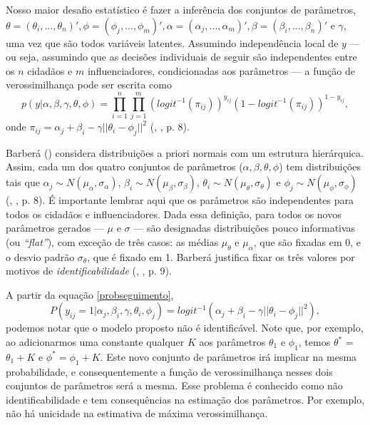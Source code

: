 \documentclass[
	12pt,				%
	openright,			%
	twoside,			%
	a4paper,			%
	english,			%
	brazil				%
	]{abntex2}
\begin{document}
 Nosso maior desafio estatístico é fazer a inferência dos conjuntos de parâmetros, $\theta = (\theta_{i}, ..., \theta_{n})', \phi = (\phi_{j}, ..., \phi_{m})', \alpha = (\alpha_{j}, ..., \alpha_{m})', \beta = (\beta_{i}, ..., \beta_{n})'$ e $\gamma$, uma vez que são todos variáveis latentes. Assumindo independência local de $y$ --- ou seja, assumindo que as decisões individuais de seguir são independentes entre os $n$ cidadãos e $m$ influenciadores, condicionadas aos parâmetros --- a função de verossimilhança pode ser escrita como
  \begin{equation}
     p(y| \alpha, \beta, \gamma, \theta, \phi) = \prod_{i=1}^{n} \prod_{j=1}^{m} (logit^{-1}(\pi_{ij}))^{y_{ij}} (1 - logit^{-1}(\pi_{ij}))^{1 - y_{ij}},\label{verossimilhancabarbera}
 \end{equation}
 onde $\pi_{ij} = \alpha_{j} + \beta_{i} - \gamma ||\theta_{i} - \phi_{j}||^{2}$ (, \citeyear{barbera2015}, p. 8).
 
 Barberá (\citeyear{barbera2015}) considera distribuições a priori normais com um estrutura hierárquica.
 Assim, cada um dos quatro conjuntos de parâmetros ($\alpha, \beta, \theta, \phi$) tem distribuições tais que $\alpha_{j} \sim N(\mu_{\alpha}, \sigma_{\alpha})$, $\beta_{i} \sim N(\mu_{\beta}, \sigma_{\beta})$, $\theta_{i} \sim N(\mu_{\theta}, \sigma_{\theta})$ e $\phi_{j} \sim N(\mu_{\phi}, \sigma_{\phi})$ (, \citeyear{barbera2015}, p. 8). É importante lembrar aqui que os parâmetros são independentes para todos os cidadãos e influenciadores. Dada essa definição, para todos os novos parâmetros gerados --- $\mu$ e $\sigma$ --- são designadas distribuições pouco informativas (ou \textit{``flat''}), com exceção de três casos: as médias $\mu_{\theta}$ e $\mu_{\alpha}$, que são fixadas em 0, e o desvio padrão $\sigma_{\theta}$, que é fixado em 1. Barberá justifica fixar os três valores por motivos de \textit{identificabilidade} (, \citeyear{barbera2015}, p. 9).
 
 A partir da equação \ref{probseguimento},
 \begin{equation*}
     P(y_{ij} = 1| \alpha_{j}, \beta_{i}, \gamma, \theta_{i}, \phi_{j}) = logit^{-1}(\alpha_{j} + \beta_{i} - \gamma ||\theta_{i} - \phi_{j}||^{2}),
 \end{equation*}
 podemos notar que o modelo proposto não é identificável. Note que, por exemplo, ao adicionarmos uma constante qualquer $K$ aos parâmetros $\theta_{1}$ e $\phi_{1}$, temos $\theta^{*}$ = $\theta_{1} + K$ e $\phi^{*}=\phi_{1} + K$. Este novo conjunto de parâmetros irá implicar na mesma probabilidade, e consequentemente a função de verossimilhança nesses dois conjuntos de parâmetros será a mesma. Esse problema é conhecido como não identificabilidade e tem consequências na estimação dos parâmetros. Por exemplo, não há unicidade na estimativa de máxima verossimilhança.
 
\end{document}
